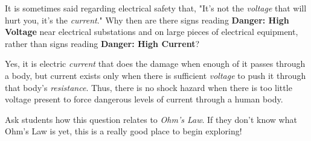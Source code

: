 

It is sometimes said regarding electrical safety that, "It's not the {\it voltage} that will hurt you, it's the {\it current}."  Why then are there signs reading {\bf Danger: High Voltage} near electrical substations and on large pieces of electrical equipment, rather than signs reading {\bf Danger: High Current}?







Yes, it is electric {\it current} that does the damage when enough of it passes through a body, but current exists only when there is sufficient {\it voltage} to push it through that body's {\it resistance}.  Thus, there is no shock hazard when there is too little voltage present to force dangerous levels of current through a human body.







Ask students how this question relates to {\it Ohm's Law}.  If they don't know what Ohm's Law is yet, this is a really good place to begin exploring!




